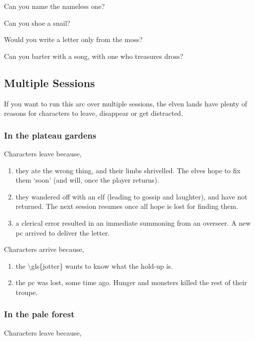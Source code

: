 \begin{exampletext}
  Can you name the nameless one?

  Can you shoe a snail?

  Would you write a letter only from the moss?

  Can you barter with a song, with one who treasures dross?
\end{exampletext}

\subsection{Multiple Sessions}

If you want to run this arc over multiple sessions, the elven lands have plenty of reasons for characters to leave, disappear or get distracted.

\subsubsection{In the plateau gardens}

Characters leave because,


\begin{enumerate}
  \item
  they ate the wrong thing, and their limbs shrivelled.
  The elves hope to fix them `soon' (and will, once the player returns).
  \item
  they wandered off with an elf (leading to gossip and laughter), and have not returned.
  The next session resumes once all hope is lost for finding them.
  \item
  a clerical error resulted in an immediate summoning from an overseer.
  A new \gls{pc} arrived to deliver the letter.
\end{enumerate}

Characters arrive because,

\begin{enumerate}
  \item
  the \gls{\gls{jotter}} wants to know what the hold-up is.
  \item
  the \gls{pc} was lost, some time ago.  Hunger and monsters killed the rest of their troupe.
\end{enumerate}

\subsubsection{In the pale forest}

Characters leave because,

